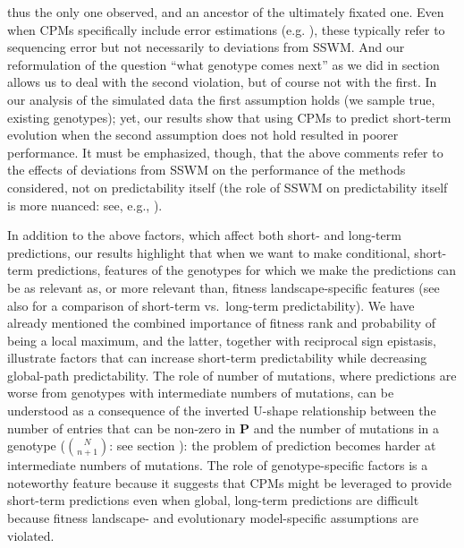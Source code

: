 \documentclass[a4paper,10pt]{article}
\begin{document}
thus the only one observed, and an ancestor of the ultimately fixated
one. Even when CPMs specifically include error estimations
(e.g. \cite{Gerstung2009}), these typically refer to sequencing error but
not necessarily to deviations from SSWM.  And our reformulation of the
question ``what genotype comes next'' as we did in section
allows us to deal with the second violation, but of course not with the
first. In our analysis of the simulated data the first assumption holds
(we sample true, existing genotypes); yet, our results show that using
CPMs to predict short-term evolution when the second assumption does not
hold resulted in poorer performance. It must be emphasized, though, that
the above comments refer to the effects of deviations from SSWM on the
performance of the methods considered, not on predictability itself (the
role of SSWM on predictability itself is more nuanced: see, e.g.,
\cite{ferretti2018,devisser_empirical_2014,bailey2017,
  szendro_predictability_2013,zhao2016, bank_predictability_2016}).




In addition to the above factors, which affect both short- and long-term
predictions, our results highlight that when we want to make conditional,
short-term predictions, features of the genotypes for which we make the
predictions can be as relevant as, or more relevant than, fitness
landscape-specific features (see also \cite{bank_predictability_2016,
  visser2018,ferretti2018} for a comparison of short-term vs.\ long-term
predictability). We have already mentioned the combined importance of
fitness rank and probability of being a local maximum, and the latter,
together with reciprocal sign epistasis, illustrate factors that can
increase short-term predictability while decreasing global-path
predictability. The role of number of mutations, where predictions are
worse from genotypes with intermediate numbers of mutations, can be
understood as a consequence of the inverted U-shape relationship between
the number of entries that can be non-zero in $\mathbf{P}$ and the number
of mutations in a genotype (${N}\choose{n + 1}$: see section
): the problem of prediction becomes harder at
intermediate numbers of mutations.  The role of genotype-specific factors
is a noteworthy feature because it suggests that CPMs might be leveraged
to provide short-term predictions even when global, long-term predictions
are difficult because fitness landscape- and evolutionary model-specific
assumptions are violated.
\end{document}
